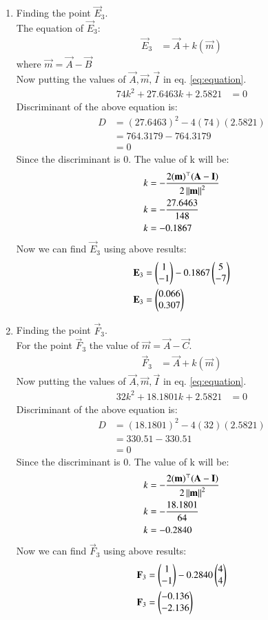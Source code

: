\documentclass[journal,12pt,twocolumn]{IEEEtran}
\theoremstyle{remark}
\begin{document}
\begin{enumerate}
\item Finding the point $\vec{E}_3$.\\
The equation of $\vec{E}_3$:
\begin{align}
\vec{E}_3 &=\vec{A}+k(\vec{m})
\end{align}
where $\vec{m} = \vec{A}-\vec{B}$ \\
Now putting the values of $\vec{A}, \vec{m}, \vec{I}$ in eq. \eqref{eq:equation}.
\begin{align}
74k^2+27.6463k+2.5821 &= 0
\end{align}
Discriminant of the above equation is:
\begin{align}
D &= (27.6463)^2-4(74)(2.5821)\\
&= 764.3179-764.3179\\
&= 0
\end{align}
Since the discriminant is $0$. The value of k will be:
\begin{align}
k &= -\frac{2(\mathbf{m})^\top(\mathbf{A-I})}{2\left\lVert\mathbf{m}\right\rVert^2} \\
k &= -\frac{27.6463}{148} \\
k &= -0.1867
\end{align}
Now we can find $\vec{E}_3$ using above results:
\begin{align}
\mathbf{E}_3 &=\begin{pmatrix}1\\-1\end{pmatrix}-0.1867\begin{pmatrix}5\\-7\end{pmatrix} \\
\mathbf{E}_3 &=\begin{pmatrix}0.066\\0.307\end{pmatrix}
\end{align}
\item Finding the point $\vec{F}_3$.\\
For the point $\vec{F}_3$ the value of $\vec{m} = \vec{A}-\vec{C}$. 
\begin{align}
\vec{F}_3 &=\vec{A}+k(\vec{m})
\end{align}
Now putting the values of $\vec{A}, \vec{m}, \vec{I}$ in eq. \eqref{eq:equation}.
\begin{align}
32k^2+18.1801k+2.5821 &= 0
\end{align}
Discriminant of the above equation is:
\begin{align}
D &= (18.1801)^2-4(32)(2.5821)\\
&= 330.51-330.51\\
&= 0
\end{align}
Since the discriminant is $0$. The value of k will be:
\begin{align}
k &= -\frac{2(\mathbf{m})^\top(\mathbf{A-I})}{2\left\lVert\mathbf{m}\right\rVert^2}\\
k &= -\frac{18.1801}{64}\\
k &= -0.2840
\end{align}
Now we can find $\vec{F}_3$ using above results:
\begin{align}
\mathbf{F}_3 &=\begin{pmatrix}1\\-1\end{pmatrix}-0.2840\begin{pmatrix}4\\4\end{pmatrix}\\
\mathbf{F}_3 &= \begin{pmatrix}-0.136\\-2.136\end{pmatrix}
\end{align}
\end{enumerate}
\end{document}
